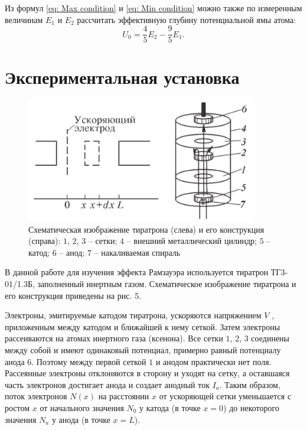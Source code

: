 \documentclass[a4paper,12pt]{article}
\begin{document}
Из формул \eqref{eq: Max condition} и \eqref{eq: Min condition} можно также по измеренным величинам $E_1$ и $E_2$ рассчитать эффективную глубину потенциальной ямы атома:
\begin{equation}\label{eq: Pootential well depth}
    U_0 = \frac{4}{5}E_2 - \frac{9}{5}E_1.
\end{equation}


\section{Экспериментальная установка}
\begin{figure}\label{fig: Exp setup}
    \begin{center}
    \vspace{-20pt}
        \includegraphics[width = 0.9\textwidth]{Exp setup.png}
    \end{center}
    \caption{Схематическая изображение тиратрона (слева) и его конструкция (справа): $1$, $2$, $3$ -- сетки; $4$ -- внешний металлический цилиндр; $5$ -- катод; $6$ -- анод; $7$ -- накаливаемая спираль}
\end{figure}
В данной работе для изучения эффекта Рамзауэра используется тиратрон ТГ3-01/1.3Б, заполненный инертным газом. Схематическое изображение тиратрона и его конструкция приведены на рис. 5.

Электроны, эмитируемые катодом тиратрона, ускоряются напряжением $V$ , приложенным между катодом и ближайшей к нему сеткой. Затем электроны рассеиваются на атомах инертного газа (ксенона). Все сетки $1$, $2$, $3$ соединены между собой и имеют одинаковый потенциал, примерно равный потенциалу анода $6$. Поэтому между первой сеткой $1$ и анодом практически нет поля. Рассеянные электроны отклоняются в сторону и уходят на сетку, а оставшаяся часть электронов достигает анода и создает анодный ток $I_a$. Таким образом, поток электронов $N(x)$ на расстоянии $x$ от ускоряющей сетки уменьшается с ростом $x$ от начального значения $N_0$ у катода (в точке $x = 0$) до некоторого значения $N_a$ у анода (в точке $x = L$).
\end{document}
